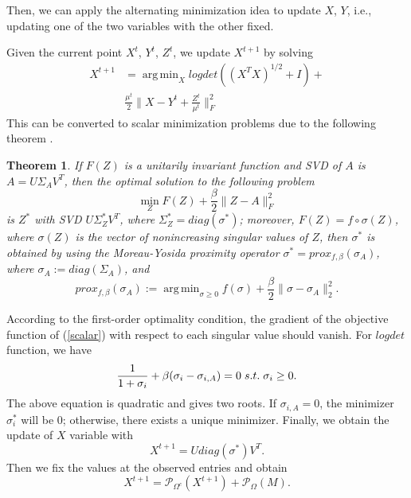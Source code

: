 \documentclass[letterpaper]{article}
\newtheorem{theorem}{Theorem}
\DeclareMathOperator*{\argmin}{arg\,min}
\begin{document}
Then, we can apply the alternating minimization idea to update $X$, $Y$, i.e., updating one of the two variables with the other fixed.

Given the current point $X^t$, $Y^t$,  $Z^t$, we update $X^{t+1}$ by solving
\begin{equation}
\begin{split}
X^{t+1}&=\argmin_{X} logdet ((X^TX)^{1/2}+I)+\\
&\frac{\mu^t}{2}\|X-Y^t+\frac{Z^t}{\mu^t}\|_F^2
\end{split}
\label{noncvx}
\end{equation}
This can be converted to scalar minimization problems due to the following theorem \cite{kang2015logdet}.
\begin{theorem}
\label{thm}
If $F(Z)$ is a unitarily invariant function and SVD of $A$ is $A = U \Sigma_A V^T$, then the optimal solution to the following problem
\begin{equation}
\min_{Z}F(Z)+\frac{\beta}{2}\|Z-A\|_F^{2}
\label{eq:Zobj}
\end{equation}
is $Z^*$ with SVD $U\Sigma_Z^* V^T$, where $\Sigma_Z^* = diag\left(\sigma^*\right)$; moreover, $F(Z) = f \circ \sigma(Z)$, where $\sigma(Z)$ is the vector of nonincreasing  singular values of $Z$, %
then $\sigma^*$ is obtained by using the Moreau-Yosida proximity operator
$\sigma^* = prox_{f, \beta} (\sigma_{A})$, where $\sigma_A := diag(\Sigma_A)$, and
\begin{equation}
\label{scalar}
prox_{f, \beta} (\sigma_A) := \argmin_{\sigma\ge 0} f(\sigma) + \frac{\beta}{2}\|\sigma - \sigma_A\|_2^2.
\end{equation}
\end{theorem}
According to the first-order optimality condition, the gradient of the objective function of  (\ref{scalar}) with respect to each singular value should vanish.
For $logdet$ function, we have
\begin{equation}
\label{svdf}
\frac{1}{1+\sigma_i}+\beta (\sigma_{i}-\sigma_{i,A})=0\hspace{0.1cm} s.t. \hspace{0.1cm}\sigma_i \ge  0.%
\end{equation}
The above equation is quadratic and gives two roots. If $\sigma_{i,A}=0$, the minimizer $\sigma_i^*$ will be 0; otherwise, there exists a unique minimizer. Finally, we obtain the update of $X$ variable with
\begin{equation}
X^{t+1}=U diag(\sigma^{*}) V^T.
\end{equation}
Then we fix the values at the observed entries and obtain
\begin{equation}
\label{solveJ}
X^{t+1}=\mathcal{P}_{\Omega^c}(X^{t+1})+\mathcal{P}_\Omega(M).
\end{equation}
\end{document}
